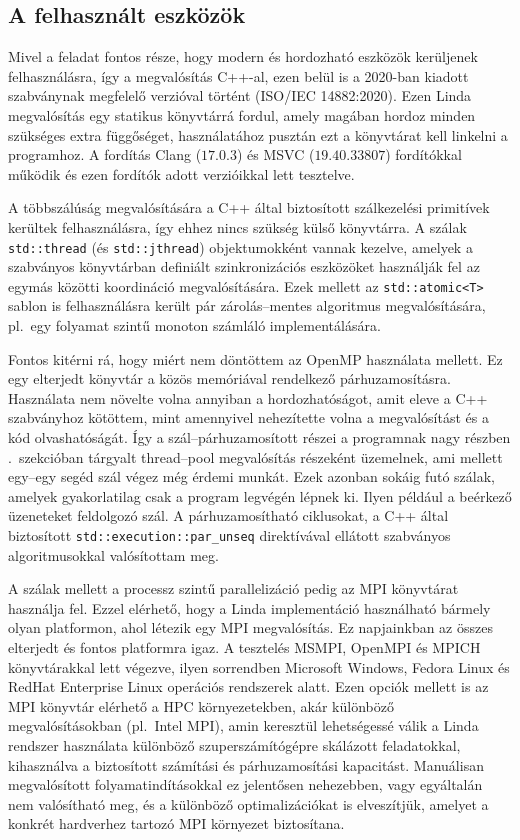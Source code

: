 \subsection{A felhasznált eszközök}\label{subsec:tools}

Mivel a feladat fontos része, hogy modern és hordozható eszközök kerüljenek felhasználásra, így a megvalósítás C++-al, ezen belül is a 2020-ban kiadott szabványnak megfelelő verzióval történt (ISO/IEC 14882:2020).
Ezen Linda megvalósítás egy statikus könyvtárrá fordul, amely magában hordoz minden szükséges extra függőséget, használatához pusztán ezt a könyvtárat kell linkelni a programhoz.
A fordítás Clang ($17.0.3$) és MSVC ($19.40.33807$) fordítókkal működik és ezen fordítók adott verzióikkal lett tesztelve.

A többszálúság megvalósítására a C++ által biztosított szálkezelési primitívek kerültek felhasználásra, így ehhez nincs szükség külső könyvtárra.
A szálak \texttt{std::thread} (és \texttt{std::jthread}) objektumokként vannak kezelve, amelyek a szabványos könyvtárban definiált szinkronizációs eszközöket használják fel az egymás közötti koordináció megvalósítására.
Ezek mellett az \texttt{std::atomic<T>} sablon is felhasználásra került pár zárolás--mentes algoritmus megvalósítására, pl.\ egy folyamat szintű monoton számláló implementálására.

Fontos kitérni rá, hogy miért nem döntöttem az OpenMP használata mellett.
Ez egy elterjedt könyvtár a közös memóriával rendelkező párhuzamosításra.
Használata nem növelte volna annyiban a hordozhatóságot, amit eleve a C++ szabványhoz kötöttem, mint amennyivel nehezítette volna a megvalósítást és a kód olvashatóságát.
Így a szál--párhuzamosított részei a programnak nagy részben  .~szekcióban tárgyalt thread--pool megvalósítás részeként üzemelnek, ami mellett egy--egy segéd szál végez még érdemi munkát.
Ezek azonban sokáig futó szálak, amelyek gyakorlatilag csak a program legvégén lépnek ki.
Ilyen például a beérkező üzeneteket feldolgozó szál.
A  párhuzamosítható ciklusokat, a C++ által biztosított \texttt{std::execution::par\_unseq} direktívával ellátott szabványos algoritmusokkal valósítottam meg.

A szálak mellett a processz szintű parallelizáció pedig az MPI könyvtárat használja fel.
Ezzel elérhető, hogy a Linda implementáció használható bármely olyan platformon, ahol létezik egy MPI megvalósítás.
Ez napjainkban az összes elterjedt és fontos platformra igaz.
A tesztelés MSMPI, OpenMPI és MPICH könyvtárakkal lett végezve, ilyen sorrendben Microsoft Windows, Fedora Linux és RedHat Enterprise Linux operációs rendszerek alatt.
Ezen opciók mellett is az MPI könyvtár elérhető a HPC környezetekben, akár különböző megvalósításokban (pl.\ Intel MPI), amin keresztül lehetségessé válik a Linda rendszer használata különböző szuperszámítógépre skálázott feladatokkal, kihasználva a biztosított számítási és párhuzamosítási kapacitást.
Manuálisan megvalósított folyamatindításokkal ez jelentősen nehezebben, vagy egyáltalán nem valósítható meg, és a különböző optimalizációkat is elveszítjük, amelyet a konkrét hardverhez tartozó MPI környezet biztosítana.

